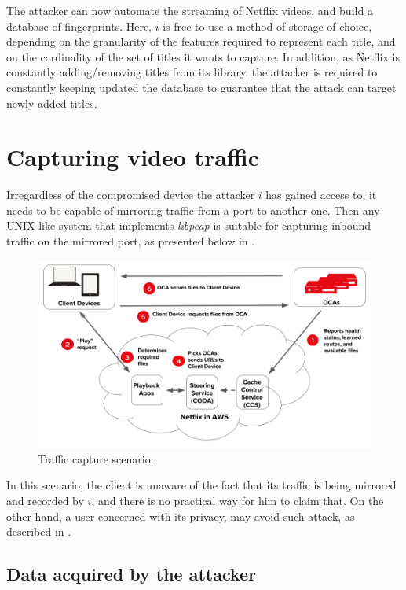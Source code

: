 The attacker can now automate the streaming of Netflix videos, and build a
database of fingerprints. Here, $i$ is free to use a method of storage of
choice, depending on the granularity of the features required to represent each
title, and on the cardinality of the set of titles it wants to capture.  In
addition, as Netflix is constantly adding/removing titles from its library, the
attacker is required to constantly keeping updated the database to guarantee
that the attack can target newly added titles.

\newpage
\section{Capturing video traffic}

Irregardless of the compromised device the attacker $i$ has gained access to,
it needs to be capable of mirroring traffic from a port to another one. Then
any UNIX-like system that implements \emph{libpcap} is suitable for capturing
inbound traffic on the mirrored port, as presented below in .


\begin{figure}[!htb]
  \centering
  \includegraphics[width=\columnwidth]{img/playback.png}
  \caption{Traffic capture scenario.}
  \label{fig:schema}
\end{figure}

In this scenario, the client is unaware of the fact that its traffic is being
mirrored and recorded by $i$, and there is no practical way for him to
claim that. On the other hand, a user concerned with its privacy, may avoid
such attack, as described in .

\subsection{Data acquired by the attacker}

